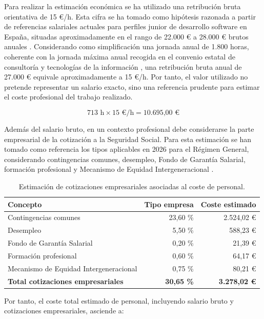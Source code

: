 Para realizar la estimación económica se ha utilizado una retribución bruta orientativa de 15 €/h. Esta cifra se ha tomado como hipótesis razonada a partir de referencias salariales actuales para perfiles junior de desarrollo software en España, situadas aproximadamente en el rango de 22.000 € a 28.000 € brutos anuales \cite{italenters-fullstack-junior-2025}. Considerando como simplificación una jornada anual de 1.800 horas, coherente con la jornada máxima anual recogida en el convenio estatal de consultoría y tecnologías de la información \cite{boe-convenio-consultoria-2025}, una retribución bruta anual de 27.000 € equivale aproximadamente a 15 €/h. Por tanto, el valor utilizado no pretende representar un salario exacto, sino una referencia prudente para estimar el coste profesional del trabajo realizado.

\begin{equation}
\text{713 h} \times \text{15 €/h} = \text{10.695,00 €}
\end{equation}

Además del salario bruto, en un contexto profesional debe considerarse la parte empresarial de la cotización a la Seguridad Social. Para esta estimación se han tomado como referencia los tipos aplicables en 2026 para el Régimen General, considerando contingencias comunes, desempleo, Fondo de Garantía Salarial, formación profesional y Mecanismo de Equidad Intergeneracional \cite{boe-cotizacion-2026}.

\begin{table}[H]
\centering
\small
\renewcommand{\arraystretch}{1.2}
\begin{tabular}{p{} r r}
\toprule
\textbf{Concepto} & \textbf{Tipo empresa} & \textbf{Coste estimado} \tabularnewline
\midrule
Contingencias comunes & 23,60 \% & 2.524,02 € \tabularnewline
Desempleo & 5,50 \% & 588,23 € \tabularnewline
Fondo de Garantía Salarial & 0,20 \% & 21,39 € \tabularnewline
Formación profesional & 0,60 \% & 64,17 € \tabularnewline
Mecanismo de Equidad Intergeneracional & 0,75 \% & 80,21 € \tabularnewline
\midrule
\textbf{Total cotizaciones empresariales} & \textbf{30,65 \%} & \textbf{3.278,02 €} \tabularnewline
\bottomrule
\end{tabular}
\caption{Estimación de cotizaciones empresariales asociadas al coste de personal.}
\label{tab:costes_personal_cotizaciones}
\end{table}

Por tanto, el coste total estimado de personal, incluyendo salario bruto y cotizaciones empresariales, asciende a:

